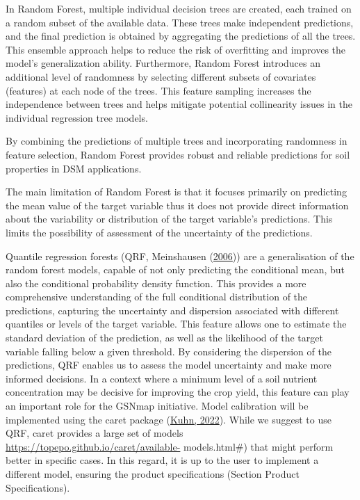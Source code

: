 \documentclass[
  10pt,
  b5paper,
  oneside]{book}
\begin{document}
In Random Forest, multiple individual decision trees are created, each trained on a random subset of the available data. These trees make independent predictions, and the final prediction is obtained by aggregating the predictions of all the trees. This ensemble approach helps to reduce the risk of overfitting and improves the model's generalization ability. Furthermore, Random Forest introduces an additional level of randomness by selecting different subsets of covariates (features) at each node of the trees. This feature sampling increases the independence between trees and helps mitigate potential collinearity issues in the individual regression tree models.

By combining the predictions of multiple trees and incorporating randomness in feature selection, Random Forest provides robust and reliable predictions for soil properties in DSM applications.

The main limitation of Random Forest is that it focuses primarily on predicting the mean value of the target variable thus it does not provide direct information about the variability or distribution of the target variable's predictions. This limits the possibility of assessment of the uncertainty of the predictions.

Quantile regression forests (QRF, Meinshausen (\protect\hyperlink{ref-Meinshausen2006}{2006})) are a generalisation of the random forest models, capable of not only predicting the conditional mean, but also the conditional probability density function. This provides a more comprehensive understanding of the full conditional distribution of the predictions, capturing the uncertainty and dispersion associated with different quantiles or levels of the target variable. This feature allows one to estimate the standard deviation of the prediction, as well as the likelihood of the target variable falling below a given threshold. By considering the dispersion of the predictions, QRF enables us to assess the model uncertainty and make more informed decisions. In a context where a minimum level of a soil nutrient concentration may be decisive for improving the crop yield, this feature can play an important role for the GSNmap initiative. Model calibration will be implemented using the caret package (\protect\hyperlink{ref-Kuhn2022}{Kuhn, 2022}). While we suggest to use QRF, caret provides a large set of models \url{https://topepo.github.io/caret/available-} models.html\#) that might perform better in specific cases. In this regard, it is up to the user to implement a different model, ensuring the product specifications (Section Product Specifications).
\end{document}
